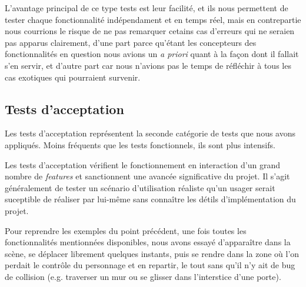 L'avantage principal de ce type tests est leur facilité, et ils nous permettent de tester chaque fonctionnalité indépendament et en temps réel, mais en contrepartie nous courrions le risque de ne pas remarquer cetains cas d'erreurs qui ne seraien pas apparus clairement, d'une part parce qu'étant les concepteurs des fonctionnalités en question nous avions un \textit{a priori} quant à la façon dont il fallait s'en servir, et d'autre part car nous n'avions pas le temps de réfléchir à tous les cas exotiques qui pourraient survenir. 

\subsection{Tests d'acceptation}
Les tests d'acceptation représentent la seconde catégorie de tests que nous avons appliqués. Moins fréquents que les tests fonctionnels, ils sont plus intensifs. \newline

Les tests d'acceptation vérifient le fonctionnement en interaction d'un grand nombre de \textit{features} et sanctionnent une avancée significative du projet. Il s'agit généralement de tester un scénario d'utilisation réaliste qu'un usager serait suceptible de réaliser par lui-même sans connaître les détils d'implémentation du projet. \newline

Pour reprendre les exemples du point précédent, une fois toutes les fonctionnalités mentionnées disponibles, nous avons essayé d'apparaître dans la scène, se déplacer librement quelques instants, puis se rendre dans la zone où l'on perdait le contrôle du personnage et en repartir, le tout sans qu'il n'y ait de bug de collision (e.g. traverser un mur ou se glisser dans l'interstice d'une porte). 
